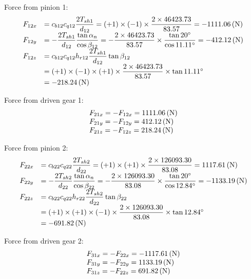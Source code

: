 Force from pinion 1:
\[
\begin{array}{ll}
F_{12x}& = c_{b12}c_{q12}\dfrac{2T_{sh1}}{d_{12}} = (+1)\times(-1)\times\dfrac{2\times 46423.73}{83.57} = -1111.06 \, (\mathrm{N})\\
F_{12y}& = -\dfrac{2T_{sh1}}{d_{12}}\dfrac{\tan\alpha_n}{\cos\beta_{12}} = -\dfrac{2\times 46423.73}{83.57}\times\dfrac{\tan 20^\circ}{\cos 11.11^\circ} = -412.12\, (\mathrm{N})\\
F_{12z}& = c_{b12}c_{q12}h_{r12}\dfrac{2T_{sh1}}{d_{12}}\tan \beta_{12} \\
&= (+1)\times(-1)\times(+1)\times\dfrac{ 2\times 46423.73}{83.57} \times\tan 11.11^\circ\\
& = -218.24 \, (\mathrm{N})
\end{array}
\]

Force from driven gear 1:
\[
\begin{array}{l}
F_{21x} = -F_{12x} = 1111.06 \, (\mathrm{N})\\
F_{21y} = -F_{12y} = 412.12 \, (\mathrm{N})\\
F_{21z} = -F_{12z} = 218.24 \, (\mathrm{N})\\
\end{array}
\]

Force from pinion 2:
\[
\begin{array}{ll}
F_{22x}& = c_{b22}c_{q22}\dfrac{2T_{sh2}}{d_{22}} = (+1)\times(+1)\times\dfrac{2\times 126093.30}{83.08} = 1117.61 \, (\mathrm{N})\\
F_{22y}& = -\dfrac{2T_{sh2}}{d_{22}}\dfrac{\tan\alpha_n}{\cos\beta_{22}} = -\dfrac{2\times 126093.30}{83.08}\times\dfrac{\tan 20^\circ}{\cos 12.84^\circ} = -1133.19\, (\mathrm{N})\\
F_{22z}& = c_{b22}c_{q22}h_{r22}\dfrac{2T_{sh2}}{d_{22}}\tan \beta_{22} \\
&= (+1)\times(+1)\times(-1)\times\dfrac{ 2\times 126093.30}{83.08} \times\tan 12.84^\circ\\
& = -691.82 \, (\mathrm{N})
\end{array}
\]

Force from driven gear 2:
\[
\begin{array}{l}
F_{31x} = -F_{22x} = -1117.61 \, (\mathrm{N})\\
F_{31y} = -F_{22y} = 1133.19 \, (\mathrm{N})\\
F_{31z} = -F_{22z} = 691.82 \, (\mathrm{N})\\
\end{array}
\]

